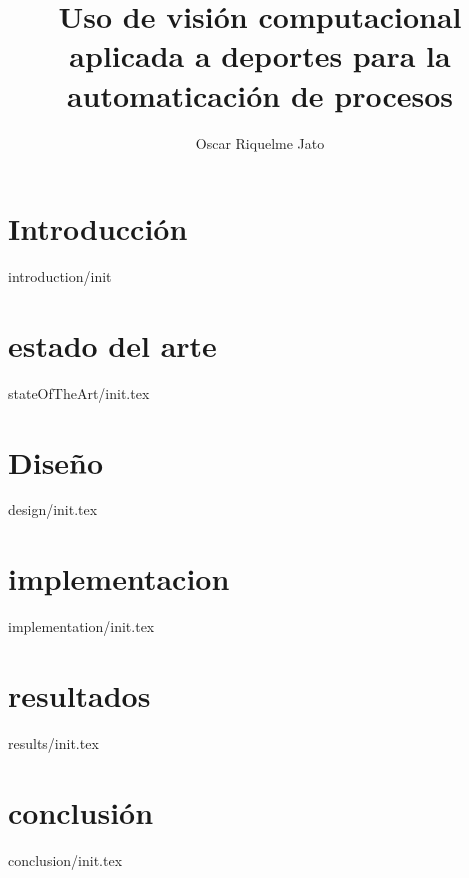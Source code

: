 \documentclass[epsbased,final,covers]{tfgtfmthesisuam}
\title[Visión computacional aplicada al deporte]{Uso de visión computacional aplicada a deportes para la automaticación de procesos}
\author{Oscar Riquelme Jato}
\begin{document}
\chapter[Introducción]{Introducción}{introduction/init}
\chapter[estado del arte]{estado del arte}{stateOfTheArt/init.tex}
\chapter[diseño]{Diseño}{design/init.tex}
\chapter[implementación]{implementacion}{implementation/init.tex}
\chapter[resultados]{resultados}{results/init.tex}
\chapter[conclusión]{conclusión}{conclusion/init.tex}
\end{document}
